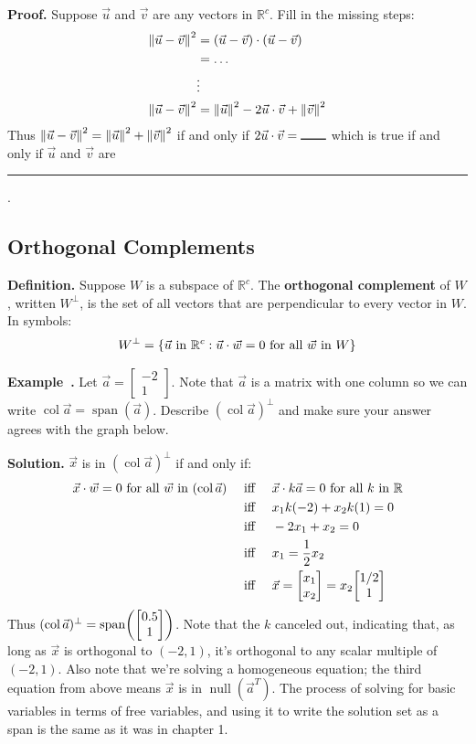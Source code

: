 \documentclass[11pt, letterpaper]{report}
\newenvironment{book}{}{}
\let\originalleft\left
\let\originalright\right
\renewcommand{\left}{\mathopen{}\mathclose\bgroup\originalleft}
\renewcommand{\right}{\aftergroup\egroup\originalright}
\newcounter{example}[section]
\newcommand{\example}{\refstepcounter{example}%
\par\noindent\textbf{Example~\theexample.} }
\newenvironment{definition}{\begin{bbox}\par\noindent\textbf{Definition. }}
  {\end{bbox}}
\newlength\oldfboxsep%
\newlength\myminiwidth%
\newenvironment{bbox}{%
  \setlength\oldfboxsep\fboxsep
  \setlength{\fboxsep}{.1in}%
  \setlength\myminiwidth\linewidth%
  \addtolength\myminiwidth{-0.2in}%
  \vspace{0.1in}%
  \begin{lrbox}{\bboxbox}\begin{minipage}{\myminiwidth}%
    }{%
    \end{minipage}\end{lrbox}%
  \noindent\fbox{\usebox{\bboxbox}}\vspace{0.1in}\setlength\fboxsep\oldfboxsep%
}
\newcommand{\R}{\mathbb{R}}
\DeclareMathOperator{\col}{col}
\DeclareMathOperator{\nul}{null}
\DeclareMathOperator{\spn}{span}
\newcommand{\bbvec}[2]{
  \begin{bmatrix} #1 \\ #2 \end{bmatrix}
}
\newcommand\nm[1]{\left\lVert #1 \right\rVert}
\begin{document}
\textbf{Proof.} Suppose $\vec{u}$ and $\vec{v}$ are any vectors in $\R^c$. Fill in the missing steps:
\begin{align*}
\nm{\vec{u}-\vec{v}}^2 &= (\vec{u}-\vec{v})\cdot(\vec{u}-\vec{v}) \\
& = \ldots \\
&\vdots  \\
\nm{\vec{u}-\vec{v}}^2 &= \nm{\vec{u}}^2 - 2\vec{u}\cdot \vec{v} + \nm{\vec{v}}^{2}
\end{align*}
Thus $\nm{\vec{u}-\vec{v}}^2 = \nm{\vec{u}}^2 + \nm{\vec{v}}^{2}$ if and only if $2\vec{u}\cdot \vec{v} = \rule{2em}{0.8pt}$ which is true if and only if $\vec{u}$ and $\vec{v}$ are \rule{8em}{0.8pt}. \blacksquare

\subsection{Orthogonal Complements}\label{subsec:orthogonal-complements}

\begin{definition} 
Suppose $W$ is a subspace of $\R^c$. The \textbf{orthogonal complement} of $W$, written $W^{\perp}$, is the set of all vectors that are perpendicular to every vector in $W$. In symbols:
\[W^{\perp} = \left\{ \vec{u} \text{ in }\R^c : \vec{u}\cdot \vec{w} = 0 \text{ for all } \vec{w} \text{ in } W\right\}\]
\end{definition}

\example {} \label{example:5.1-four-subspaces-1} Let $\vec{a}=\bbvec{-2}{1}$. Note that $\vec{a}$ is a matrix with one column so we can write $\col \vec{a}=\spn(\vec{a})$. Describe $(\col \vec{a})^{\perp}$ and make sure your answer agrees with the graph below.

\begin{book}
\textbf{Solution.} $\vec{x}$ is in $(\col \vec{a})^{\perp}$ if and only if:
\begin{align*}
\vec{x}\cdot \vec{w} = 0 \text{ for all } \vec{w} \text{ in } (\col \vec{a}) &\text{ \quad iff \quad } \vec{x}\cdot k\vec{a} = 0 \text{ for all } k \text{ in } \R \\
&\text{ \quad iff \quad } x_1k(-2) + x_2k(1) = 0 \\
&\text{ \quad iff \quad } -2x_1 + x_2 = 0 \\
&\text{ \quad iff \quad } x_1 = \frac{1}{2}x_2 \\
&\text{ \quad iff \quad } \vec{x}=\bbvec{x_1}{x_2}= x_2 \bbvec{1/2}{1}
\end{align*}
Thus $(\col\vec{a})^{\perp}=\spn \left( \bbvec{0.5}{1} \right)$. Note that the $k$ canceled out, indicating that, as long as $\vec{x}$ is orthogonal to $(-2,1)$, it's orthogonal to any scalar multiple of $(-2,1)$. Also note that we're solving a homogeneous equation; the third equation from above means $\vec{x}$ is in $\nul(\vec{a}^T)$. The process of solving for basic variables in terms of free variables, and using it to write the solution set as a span is the same as it was in chapter 1. \blacksquare
\end{book}
\end{document}
